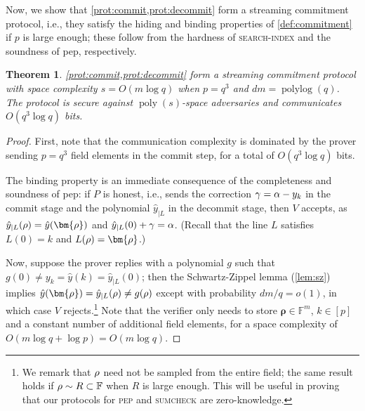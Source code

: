 \documentclass[10pt,a4paper]{article}
\newtheorem{theorem}{Theorem}[section]
\theoremstyle{definition}
\newcommand{\field}{\mathbb{F}}
\newcommand{\poly}{\operatorname{poly}}
\newcommand{\polylog}{\operatorname{polylog}}
\newcommand{\searchindex}{\normalfont\textsc{search-index}\xspace}
\newcommand{\pep}{\normalfont\textsc{pep}\xspace}
\newcommand{\pepprotocol}{\textsf{pep}\xspace}
\newcommand{\sumcheck}{\normalfont\textsc{sumcheck}\xspace}
\newcommand{\pcommitlength}{p}
\newcommand{\pcommitstring}{y}
\newcommand{\dimension}{m}
\newcommand{\degree}{d}
\newcommand{\fieldsize}{q}
\newcommand{\fingerprinttuple}{\bm{\rho}}
\renewcommand{\line}{L}
\def\fe#1{
    \ifnum#1=1
        \alpha
    \else
    \ifnum#1=2
        \beta
    \else
    \ifnum#1=3
        \gamma
    \fi\fi\fi
}
\def\rfe#1{
    \ifnum#1=1
        \rho
    \else
    \ifnum#1=2
        \sigma
    \else
    \fi\fi
}
\begin{document}
Now, we show that \cref{prot:commit,prot:decommit} form a streaming commitment protocol, i.e., they satisfy the hiding and binding properties of \cref{def:commitment} if $\pcommitlength$ is large enough; these follow from the hardness of \searchindex and the soundness of \pepprotocol, respectively.
\begin{theorem}
    \label{thm:pv-commitment}
    \cref{prot:commit,prot:decommit} form a streaming commitment protocol with space complexity $s = O(\dimension \log \fieldsize)$ when $\pcommitlength = \fieldsize^3$ and $\degree \dimension = \polylog(\fieldsize)$. The protocol is secure against $\poly(s)$-space adversaries and communicates $O(\fieldsize^3 \log \fieldsize)$ bits.
\end{theorem}

\begin{proof}
    First, note that the communication complexity is dominated by the prover sending $\pcommitlength = \fieldsize^3$ field elements in the \textsf{commit} step, for a total of $O(\fieldsize^3 \log \fieldsize)$ bits.

    The binding property is an immediate consequence of the completeness and soundness of \pepprotocol: if $P$ is honest, i.e., sends the correction $\fe3 = \fe1 - \pcommitstring_k$ in the \textsf{commit} stage and the polynomial $\hat y_{|\line}$ in the \textsf{decommit} stage, then $V$ accepts, as $\hat \pcommitstring_{|\line}(\rfe1) = \hat \pcommitstring(\fingerprinttuple)$ and $\hat \pcommitstring_{|\line}(0) + \fe3 = \fe1$. (Recall that the line $\line$ satisfies $\line(0) = k$ and $\line(\rfe1) = \fingerprinttuple$.)
    
    Now, suppose the prover replies with a polynomial $g$ such that $g(0) \neq \pcommitstring_k = \hat \pcommitstring(k) = \hat \pcommitstring_{|\line}(0)$; then the Schwartz-Zippel lemma (\cref{lem:sz}) implies $\hat \pcommitstring(\fingerprinttuple) = \hat \pcommitstring_{|\line}(\rfe1) \neq g(\rfe1)$ except with probability $\degree \dimension / \fieldsize = o(1)$, in which case $V$ rejects.\footnote{We remark that $\rfe1$ need not be sampled from the entire field; the same result holds if $\rfe1 \sim R \subset \field$ when $R$ is large enough. This will be useful in proving that our protocols for \pep and \sumcheck are zero-knowledge.} Note that the verifier only needs to store $\fingerprinttuple \in \field^\dimension$, $k \in [\pcommitlength]$ and a constant number of additional field elements, for a space complexity of $O(\dimension \log \fieldsize + \log \pcommitlength) = O(\dimension \log \fieldsize)$.


\end{proof}
\end{document}
